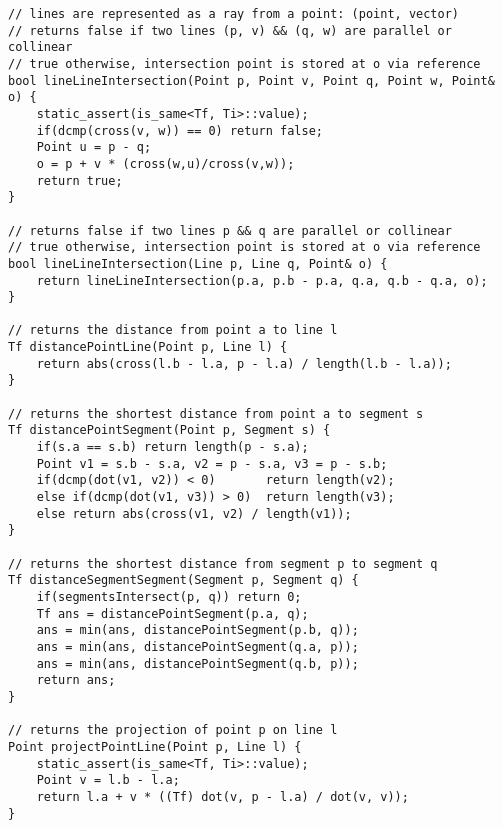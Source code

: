 \documentclass[FSZ,a4paper,onesided]{article}
\begin{document}
\begin{multicols*}{\COLS}
\begin{lstlisting}
// lines are represented as a ray from a point: (point, vector)
// returns false if two lines (p, v) && (q, w) are parallel or collinear
// true otherwise, intersection point is stored at o via reference
bool lineLineIntersection(Point p, Point v, Point q, Point w, Point& o) {
    static_assert(is_same<Tf, Ti>::value);
    if(dcmp(cross(v, w)) == 0) return false;
    Point u = p - q;
    o = p + v * (cross(w,u)/cross(v,w));
    return true;
}

// returns false if two lines p && q are parallel or collinear
// true otherwise, intersection point is stored at o via reference
bool lineLineIntersection(Line p, Line q, Point& o) {
    return lineLineIntersection(p.a, p.b - p.a, q.a, q.b - q.a, o);
}

// returns the distance from point a to line l
Tf distancePointLine(Point p, Line l) {
    return abs(cross(l.b - l.a, p - l.a) / length(l.b - l.a));
}

// returns the shortest distance from point a to segment s
Tf distancePointSegment(Point p, Segment s) {
    if(s.a == s.b) return length(p - s.a);
    Point v1 = s.b - s.a, v2 = p - s.a, v3 = p - s.b;
    if(dcmp(dot(v1, v2)) < 0)       return length(v2);
    else if(dcmp(dot(v1, v3)) > 0)  return length(v3);
    else return abs(cross(v1, v2) / length(v1));
}

// returns the shortest distance from segment p to segment q
Tf distanceSegmentSegment(Segment p, Segment q) {
    if(segmentsIntersect(p, q)) return 0;
    Tf ans = distancePointSegment(p.a, q);
    ans = min(ans, distancePointSegment(p.b, q));
    ans = min(ans, distancePointSegment(q.a, p));
    ans = min(ans, distancePointSegment(q.b, p));
    return ans;
}

// returns the projection of point p on line l
Point projectPointLine(Point p, Line l) {
    static_assert(is_same<Tf, Ti>::value);
    Point v = l.b - l.a;
    return l.a + v * ((Tf) dot(v, p - l.a) / dot(v, v));
}\end{lstlisting}

\end{multicols*}
\end{document}
